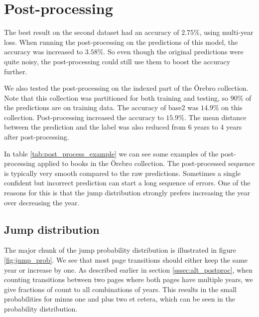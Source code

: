 \section{Post-processing} \label{sec:result_post_process}

The best result on the second dataset had an accuracy of $2.75\%$, using multi-year loss. When running the post-processing on the predictions of this model, the accuracy was increased to $3.58\%$. So even though the original predictions were quite noisy, the post-processing could still use them to boost the accuracy further.

We also tested the post-processing on the indexed part of the Örebro collection. Note that this collection was partitioned for both training and testing, so $90\%$ of the predictions are on training data. The accuracy of base2 was $14.9\%$ on this collection. Post-processing increased the accuracy to $15.9\%$. The mean distance between the prediction and the label was also reduced from 6 years to 4 years after post-processing.



In table \ref{tab:post_process_example} we can see some examples of the post-processing applied to books in the Örebro collection. The post-processed sequence is typically very smooth compared to the raw predictions. Sometimes a single confident but incorrect prediction can start a long sequence of errors. One of the reasons for this is that the jump distribution strongly prefers increasing the year over decreasing the year.

\subsection{Jump distribution}



The major chunk of the jump probability distribution is illustrated in figure \ref{fig:jump_prob}. We see that most page transitions should either keep the same year or increase by one.
As described earlier in section \ref{sssec:alt_postproc}, when counting transitions between two pages where both pages have multiple years, we give fractions of count to all combinations of years. This results in the small probabilities for minus one and plus two et cetera, which can be seen in the probability distribution.

